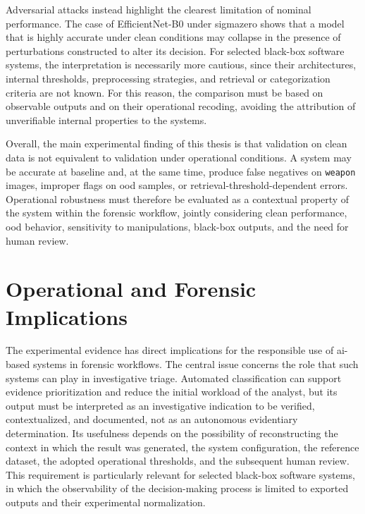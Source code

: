Adversarial attacks instead highlight the clearest limitation of nominal
performance. The case of EfficientNet-B0 under \gls{sigmazero} shows that a
model that is highly accurate under clean conditions may collapse in the
presence of perturbations constructed to alter its decision. For selected
black-box software systems, the interpretation is necessarily more cautious,
since their architectures, internal thresholds, preprocessing strategies, and
retrieval or categorization criteria are not known. For this reason, the
comparison must be based on observable outputs and on their operational
recoding, avoiding the attribution of unverifiable internal properties to the
systems.

Overall, the main experimental finding of this thesis is that validation on
clean data is not equivalent to validation under operational conditions. A
system may be accurate at baseline and, at the same time, produce false
negatives on \texttt{weapon} images, improper flags on \gls{ood} samples, or
retrieval-threshold-dependent errors. Operational robustness must therefore be
evaluated as a contextual property of the system within the forensic workflow,
jointly considering clean performance, \gls{ood} behavior, sensitivity to
manipulations, black-box outputs, and the need for human review.

\section{Operational and Forensic Implications}
\label{sec:conclusions-operational-implications}

The experimental evidence has direct implications for the responsible use of
\gls{ai}-based systems in forensic workflows. The central issue concerns the
role that such systems can play in investigative triage. Automated
classification can support evidence prioritization and reduce the initial
workload of the analyst, but its output must be interpreted as an investigative
indication to be verified, contextualized, and documented, not as an autonomous
evidentiary determination. Its usefulness depends on the possibility of
reconstructing the context in which the result was generated, the system
configuration, the reference dataset, the adopted operational thresholds, and
the subsequent human review. This requirement is particularly relevant for
selected black-box software systems, in which the observability of the
decision-making process is limited to exported outputs and their experimental
normalization.

